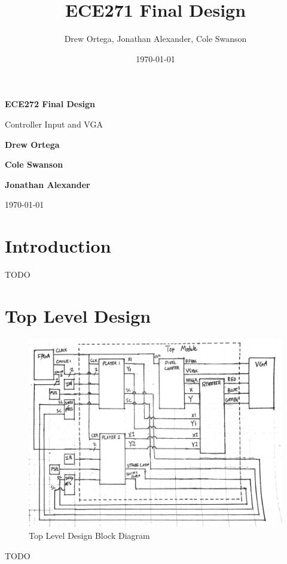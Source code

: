 \documentclass[]{article}
\title{ECE271 Final Design}
\author{Drew Ortega, Jonathan Alexander, Cole Swanson}
\date{\today}
\begin{document}
\begin{titlepage}
    \begin{center}
        \vspace*{1cm}
 
        \Huge
        \textbf{ECE272 Final Design}
 
        \vspace{0.5cm}
        \LARGE
        Controller Input and VGA
 
        \vspace{1.5cm}
 
        \textbf{Drew Ortega}
        
        \textbf{Cole Swanson}
        
        \textbf{Jonathan Alexander}
 
 		\vspace{0.5cm}
        \today
 
    \end{center}
\end{titlepage}

\newpage
	\tableofcontents
\newpage

\section{Introduction}
TODO

\section{Top Level Design}
\begin{figure}[H]\centering
    \includegraphics[width=\linewidth]{figures/Top_Block.jpg}
    \caption{Top Level Design Block Diagram} 
    \label{fig:biPhaseExample}
\end{figure}
TODO
\end{document}
